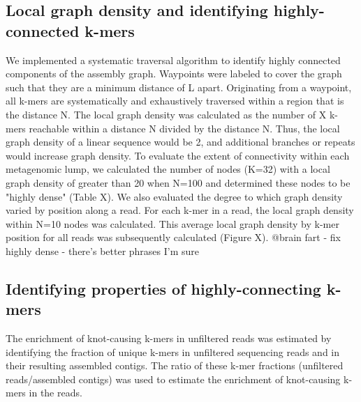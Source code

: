 \documentclass[11pt]{article} %
\begin{document}
\subsection{Local graph density and identifying highly-connected k-mers}
We implemented a systematic traversal algorithm to identify highly
connected components of the assembly graph.  Waypoints were labeled to cover the graph such that they
are a minimum distance of L apart. Originating from a waypoint, all
k-mers are systematically and exhaustively traversed within a region
that is the distance N.   The local graph density was calculated as the number of X k-mers reachable within a distance N divided by the distance N.  Thus, the local graph density of a linear sequence would be 2, and additional branches or repeats would increase graph density.   To evaluate the extent of connectivity within each metagenomic lump, we calculated the number of nodes (K=32) with a local graph density of greater than 20 when N=100 and determined these nodes to be "highly dense" (Table X).  We also evaluated the degree to which graph density varied by position along a read.  For each k-mer in a read, the local graph density within N=10 nodes was calculated.  This average local graph density by k-mer position for all reads was subsequently calculated (Figure X).
@brain fart - fix highly dense - there's better phrases I'm sure

\subsection{Identifying properties of highly-connecting k-mers}
	The enrichment of knot-causing k-mers in unfiltered reads was estimated 
by identifying the fraction of unique k-mers in unfiltered sequencing
reads and in their resulting assembled contigs. The ratio of these k-mer fractions (unfiltered reads/assembled contigs) was used to estimate the enrichment of knot-causing k-mers in the reads. 
	
\end{document}

